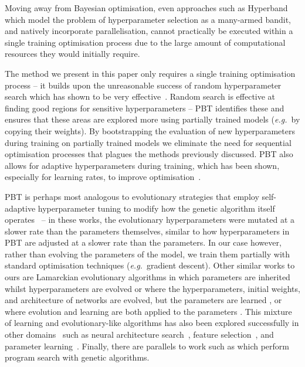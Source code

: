 \documentclass{article} %
\def\eg{\emph{e.g.}}
\begin{document}
Moving away from Bayesian optimisation, even approaches such as Hyperband~\citep{li2016hyperband} which model the problem of hyperparameter selection as a many-armed bandit, and natively incorporate parallelisation, cannot practically be executed within a single training optimisation process due to the large amount of computational resources they would initially require.

The method we present in this paper only requires a single training optimisation process -- it builds upon the unreasonable success of random hyperparameter search which has shown to be very effective~\citep{bergstra2012random}. Random search is effective at finding good regions for sensitive hyperparameters -- PBT identifies these and ensures that these areas are explored more using partially trained models (\eg~by copying their weights). By bootstrapping the evaluation of new hyperparameters during training on partially trained models we eliminate the need for sequential optimisation processes that plagues the methods previously discussed. PBT also allows for adaptive hyperparameters during training, which has been shown, especially for learning rates, to improve optimisation~\citep{loshchilov2016sgdr,smith2017cyclical,masse2015speed}. 

PBT is perhaps most analogous to evolutionary strategies that employ self-adaptive hyperparameter tuning to modify how the genetic algorithm itself operates~\citep{back1998overview,Spears95adaptingcrossover,gloger2004self,clune2008natural} -- in these works, the evolutionary hyperparameters were mutated at a slower rate than the parameters themselves, similar to how hyperparameters in PBT are adjusted at a slower rate than the parameters. In our case however, rather than evolving the parameters of the model, we train them partially with standard optimisation techniques (\eg~gradient descent). Other similar works to ours are Lamarckian evolutionary algorithms in which parameters are inherited whilst hyperparameters are evolved \citep{castillo2006lamarckian} or where the hyperparameters, initial weights, and architecture of networks are evolved, but the parameters are learned \citep{castillo1999g,husken2000optimization}, or where evolution and learning are both applied to the parameters \citep{ku1997exploring,houck1997empirical,igel2005evolutionary}. This mixture of learning and evolutionary-like algorithms has also been explored successfully in other domains~\citep{zhang2011evolutionary} such as neural architecture search~\citep{real2017large,liu2017hierarchical}, feature selection~\citep{xue2016survey}, and parameter learning~\citep{fernando2016convolution}. Finally, there are parallels to work such as \cite{salustowicz1997probabilistic} which perform program search with genetic algorithms.
\end{document}
